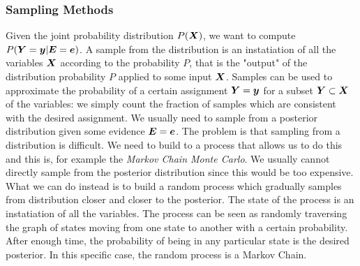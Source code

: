 \subsubsection{Sampling Methods}
Given the joint probability distribution $P(\bm{X})$, we want to compute $P(\bm{Y}=\bm{y}\vert \bm{E}=\bm{e})$. A sample from the distribution is an instatiation of all the variables $\bm{X}$ according to the probability $P$, that is the "output" of the distribution probability $P$ applied to some input $\bm{X}$. \newline
Samples can be used to approximate the probability of a certain assignment $\bm{Y}=\bm{y}$ for a subset $\bm{Y}\subset\bm{X}$ of the variables: we simply count the fraction of samples which are consistent with the desired assignment. \newline
We usually need to sample from a posterior distribution given some evidence $\bm{E}=\bm{e}$.
The problem is that sampling from a distribution is difficult. We need to build to a process that allows us to do this and this is, for example the \textit{Markov Chain Monte Carlo}. 
We usually cannot directly sample from the posterior distribution since this would be too expensive. What we can do instead is to build a random process which gradually samples from distribution closer and closer to the posterior. \newline
The state of the process is an instatiation of all the variables. \newline
The process can be seen as randomly traversing the graph of states moving from one state to another with a certain probability. After enough time, the probability of being in any particular state is the desired posterior. \newline
In this specific case, the random process is a Markov Chain. 
%
